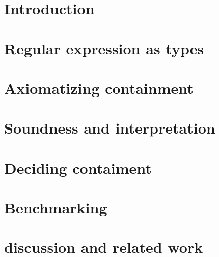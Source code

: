 \documentclass[runningheads]{llncs}
\begin{document}
 \section{Introduction}\label{sec:introduction}
  

\section{Regular expression as types}\label{sec:background}


\section{Axiomatizing containment}\label{sec:axiomatization}


% 

\section{Soundness and interpretation} \label{sec:soundness}


\section{Deciding contaiment}\label{sec:decide}




\section{Benchmarking}


\section{discussion and related work}\label{sec:discussion}



   
\end{document}
